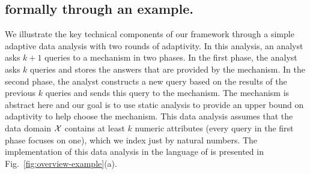 


\subsection{ {\THESYSTEM} formally through an example.}
We illustrate the key technical components of our framework through a simple adaptive data analysis with two rounds of adaptivity.
%
In this analysis, an analyst asks $k+1$ queries to a mechanism in two phases.
In the first phase, the analyst asks $k$ queries and stores the answers that are provided by the mechanism. In the second phase, the analyst constructs a new query based on the results of the previous $k$ queries and sends this query to the mechanism. 
The mechanism is abstract here and our goal is to use static analysis to provide an upper bound on adaptivity to help choose the mechanism.
This data analysis assumes that the data domain $\mathcal{X}$ 
contains at least $k$ numeric attributes 
(every query in the first phase focuses on one), which we index just by natural numbers.
The implementation of this data analysis in the language of {\THESYSTEM} is presented in Fig.~\ref{fig:overview-example}(a).

